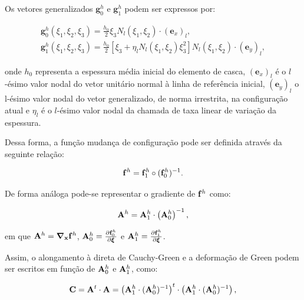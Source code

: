 Os vetores generalizados $\mathbf{g}^{h}_{0}$ e $\mathbf{g}^{h}_{1}$ podem ser expressos por:

\begin{align}
	\mathbf{g}^{h}_{0} (\xi_{1},\xi_{2}, \xi_{3}) = \frac{h_{0}}{2}\xi_{3} N_{l}\left(\xi_{1},\xi_{2}\right) \cdot  (\mathbf{e}_x)_l, \\
	\mathbf{g}^{h}_{1} (\xi_{1},\xi_{2}, \xi_{3}) = \frac{h_{0}}{2}\left[\xi_{3} + \eta_l N_l\left(\xi_{1},\xi_{2}\right)\xi_{3}^2\right]N_{l}\left(\xi_{1},\xi_{2}\right) \cdot (\mathbf{e}_y)_l,
\end{align}

\noindent onde $h_{0}$ representa a espessura média inicial do elemento de casca, $(\mathbf{e}_x)_l$ é o $l$-ésimo valor nodal do vetor unitário normal à linha de referência inicial, $(\mathbf{e}_y)_l$ o l-ésimo valor nodal do vetor generalizado, de norma irrestrita, na configuração atual e $\eta_l$ é o $l$-ésimo valor nodal da chamada de taxa linear de variação da espessura.

Dessa forma, a função mudança de configuração pode ser definida através da seguinte relação:

\begin{align}
	\mathbf{f}^{h} = \mathbf{f}^{h}_{1} \circ  (\mathbf{f}^{h}_{0})^{-1} \label{eq:eq_mud_conf}.
\end{align}

De forma análoga pode-se representar o gradiente de  $\mathbf{f}^{h}$ como:

\begin{align}
	\mathbf{A}^{h} = \mathbf{A}^{h}_{1} \cdot \left(\mathbf{A}^{h}_{0}\right)^{-1} \label{eq:gradDeformation},
\end{align}

\noindent em que $\mathbf{A}^{h} = \boldsymbol{\nabla}_{\mathbf{x}} \mathbf{f}^{h}$, $\mathbf{A}^{h}_{0} = \frac{\partial  \mathbf{f}^{h}_{0}} {\partial \boldsymbol{\xi}}$ e  $\mathbf{A}^{h}_{1} =  \frac{\partial  \mathbf{f}^{h}_{1}} {\partial \boldsymbol{\xi}}$.

Assim, o alongamento à direta de Cauchy-Green e a deformação de Green podem ser escritos em função de $\mathbf{A}^{h}_{0}$ e $\mathbf{A}^{h}_{1}$, como:

\begin{align}
	\mathbf{C} = \mathbf{A}^{t} \cdot \mathbf{A} = \left(\mathbf{A}^{h}_{1} \cdot (\mathbf{A}^{h}_{0})^{-1}\right)^{t} \cdot \left(\mathbf{A}^{h}_{1} \cdot (\mathbf{A}^{h}_{0})^{-1}\right),
\end{align}

